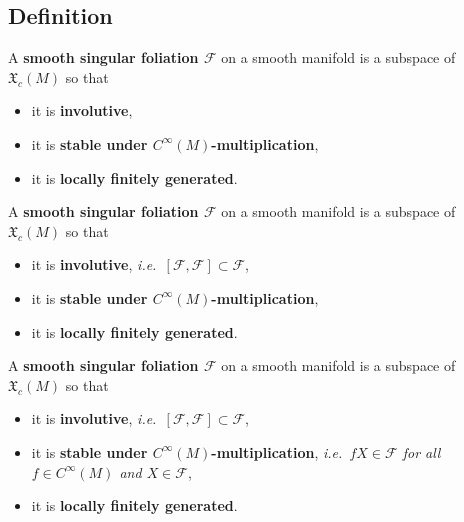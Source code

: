 \documentclass[hyperref={pdfpagelabels=false}]{beamer}
\theoremstyle{plain}
\theoremstyle{remark}
\begin{document}
\subsection{Definition}

\begin{frame}
\begin{definition}
A \textbf{smooth singular foliation $\mathcal{F}$} on a smooth manifold is a subspace of $\mathfrak{X}_c(M)$ so that
\begin{itemize}
	\item it is \textbf{involutive},
	\item it is \textbf{stable under $C^\infty(M)$-multiplication},
	\item it is \textbf{locally finitely generated}.
\end{itemize}
\end{definition}
\end{frame}

\begin{frame}
\begin{definition}
A \textbf{smooth singular foliation $\mathcal{F}$} on a smooth manifold is a subspace of $\mathfrak{X}_c(M)$ so that
\begin{itemize}
	\item it is \textbf{involutive}, \textit{i.e.\ $[\mathcal{F}, \mathcal{F}] \subset \mathcal{F}$},
	\item it is \textbf{stable under $C^\infty(M)$-multiplication},
	\item it is \textbf{locally finitely generated}.
\end{itemize}
\end{definition}
\end{frame}

\begin{frame}
\begin{definition}
A \textbf{smooth singular foliation $\mathcal{F}$} on a smooth manifold is a subspace of $\mathfrak{X}_c(M)$ so that
\begin{itemize}
	\item it is \textbf{involutive}, \textit{i.e.\ $[\mathcal{F}, \mathcal{F}] \subset \mathcal{F}$},
	\item it is \textbf{stable under $C^\infty(M)$-multiplication}, \textit{i.e.\ $fX \in \mathcal{F}$ for all $f \in C^\infty(M)$ and $X \in \mathcal{F}$},
	\item it is \textbf{locally finitely generated}.
\end{itemize}
\end{definition}
\end{frame}
\end{document}
